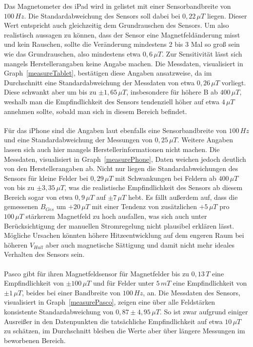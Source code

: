 \documentclass[12pt, a4paper]{article}
\begin{document}
Das Magnetometer des iPad wird in \cite{sensordb} gelistet mit einer Sensorbandbreite von $100\,Hz$. Die Standardabweichung des Sensors soll dabei bei $0,22\,\mu{T}$ liegen. Dieser Wert entspricht auch gleichzeitig dem Grundrauschen des Sensors. Um also realistisch aussagen zu können, dass der Sensor eine Magnetfeldänderung misst und kein Rauschen, sollte die Veränderung mindestens 2 bis 3 Mal so groß sein wie das Grundrauschen, also mindestens etwa $0,6\,\mu{T}$. Zur Sensitivität lässt sich mangels Herstellerangaben keine Angabe machen.\newline
Die Messdaten, visualisiert in Graph~\ref{measureTablet}, bestätigen diese Angaben ansatzweise, da im Durchschnitt eine Standardabweichung der Messdaten von etwa $0,26\,\mu{T}$ vorliegt. Diese schwankt aber um bis zu $\pm1,65\,\mu{T}$, insbesondere für höhere B ab $400\,\mu{T}$, weshalb man die Empfindlichkeit des Sensors tendenziell höher auf etwa $4\,\mu{T}$ annehmen sollte, sobald man sich in diesem Bereich befindet.
\paragraph{}

Für das iPhone sind die Angaben laut \cite{sensordb} ebenfalls eine Sensorbandbreite von $100\,Hz$ und eine Standardabweichung der Messungen von $0,25\,\mu{T}$. Weitere Angaben lassen sich auch hier mangels Herstellerinformationen nicht machen.\newline
Die Messdaten, visualisiert in Graph~\ref{measurePhone}, Daten weichen jedoch deutlich von den Herstellerangaben ab. Nicht nur liegen die Standardabweichungen des Sensors für kleine Felder bei $0,29\,\mu{T}$ mit Schwankungen bei Feldern ab $400\,\mu{T}$ von bis zu $\pm3,35\,\mu{T}$, was die realistische Empfindlichkeit des Sensors ab diesem Bereich sogar von etwa $0,9\,\mu{T}$ auf $\pm7\,\mu{T}$ hebt. Es fällt außerdem auf, dass die gemessenen $B_{Ges}$ um $+20\,\mu{T}$ mit einer Tendenz von zusätzlichen $+5\,\mu{T}$ pro $100\,\mu{T}$ stärkerem Magnetfeld zu hoch ausfallen, was sich auch unter Berücksichtigung der manuellen Stromregelung nicht plausibel erklären lässt. Mögliche Ursachen könnten höhere Hitzeentwicklung auf dem engeren Raum bei höheren $V_{Hall}$ aber auch magnetische Sättigung und damit nicht mehr ideales Verhalten des Sensors sein.
\paragraph{}

Pasco gibt für ihren Magnetfeldsensor für Magnetfelder bis zu $0,13\,T$ eine Empfindlichkeit von $\pm100\,\mu{T}$ und für Felder unter $5\,mT$ eine Empfindlichkeit von $\pm1\,\mu{T}$, beides bei einer Bandbreite von $100\,Hz$, an.\newline
Die Messdaten des Sensors, visualisiert in Graph~\ref{measurePasco}, zeigen eine über alle Feldstärken konsistente Standardabweichung von $0,87\pm4,95\,\mu{T}$. So ist zwar aufgrund einiger Ausreißer in den Datenpunkten die tatsächliche Empfindlichkeit auf etwa $10\,\mu{T}$ zu schätzen, im Durchschnitt bleiben die Werte aber über längere Messungen im beworbenen Bereich.
\end{document}
